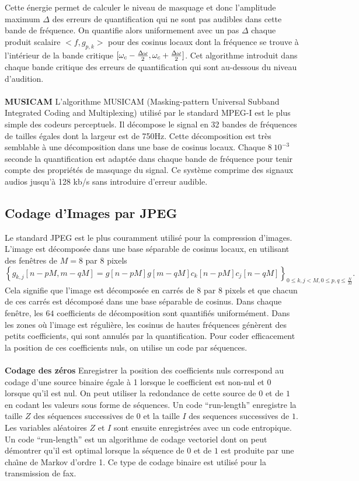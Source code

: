 Cette \'energie permet de calculer le niveau de masquage et
donc l'amplitude maximum $\Delta$
des erreurs de quantification qui ne sont pas audibles dans
cette bande de fr\'equence. On quantifie alors
uniformement avec un pas $\Delta$ chaque produit scalaire
$<f , g_{p,k}>$ pour des cosinus locaux
dont la fr\'equence se trouve \`a l'int\'erieur de la bande critique
$[{\omega}_c - \frac{\Delta {\omega}} 2, {\omega}_c + \frac{\Delta {\omega}} 2 ]$.
Cet algorithme introduit dans chaque bande critique des erreurs
de quantification qui sont au-dessous du niveau d'audition.\\
\\
{\bf MUSICAM}
L'algorithme MUSICAM
(Masking-pattern Universal Subband Integrated Coding and
Multiplexing) utilis\'e par le standard MPEG-I est
le plus simple des
codeurs perceptuels. Il d\'ecompose le signal en 32 bandes de fr\'equences
de tailles \'egales dont la largeur  est de 750Hz.
Cette d\'ecomposition est tr\`es semblable \`a une d\'ecomposition dans
une base de cosinus locaux.
Chaque $8~ 10^{-3}$ seconde
la quantification est adapt\'ee dans chaque bande de
fr\'equence pour tenir compte des propri\'et\'es de masquage du signal.
Ce syst\`eme comprime des signaux audios jusqu'\`a 128 kb/s sans
introduire d'erreur audible.

\subsection{Codage d'Images par JPEG}
\label{still-image-comp}

Le standard JPEG est le plus
couramment utilis\'e pour la compression
d'images.
L'image est d\'ecompos\'ee dans une base s\'eparable de
cosinus locaux, en utilisant des fen\^etres de $M = 8$ par 8 pixels
\[
\left\{
g_{k,j} [n - pM ,m - qM] = g[n-pM] g[m-qM]
c_k [n-pM] c_j [n-qM]
\right\}_{0 \leq k,j < M, 0 \leq p,q \leq \frac N M}.
\]
Cela signifie que l'image est d\'ecompos\'ee en carr\'es de
$8$ par 8 pixels et que chacun de ces carr\'es est d\'ecompos\'e
dans une base s\'eparable de cosinus. Dans chaque fen\^etre,
les $64$ coefficients de d\'ecomposition
sont quantifi\'es uniform\'ement.
Dans les zones
o\`u l'image est r\'eguli\`ere,
les cosinus de hautes fr\'equences g\'en\`erent des
petits coefficients, qui sont annul\'es par la quantification.
Pour coder efficacement la position de ces coefficients nuls,
on utilise un code par s\'equences.
\\
\\
{\bf Codage des z\'eros}
Enregistrer la position des coefficients nuls correspond au codage
d'une source binaire \'egale \`a 1 lorsque le coefficient est non-nul
et $0$ lorsque qu'il est nul.
On peut utiliser la redondance de cette source de $0$ et de $1$
en codant les valeurs sous forme de s\'equences.
Un code ``run-length'' enregistre la taille
$Z$ des s\'equences successives de $0$ et la taille $I$ des sequences
successives de $1$. Les variables al\'eatoires $Z$ et $I$
sont ensuite
enregistr\'ees avec un code entropique.
Un code ``run-length'' est un algorithme de codage vectoriel
dont on peut d\'emontrer qu'il est optimal lorsque la s\'equence
de $0$ et de $1$ est produite par une cha\^{\i}ne de Markov d'ordre 1.
Ce type de codage binaire est utilis\'e pour la transmission de
fax.

